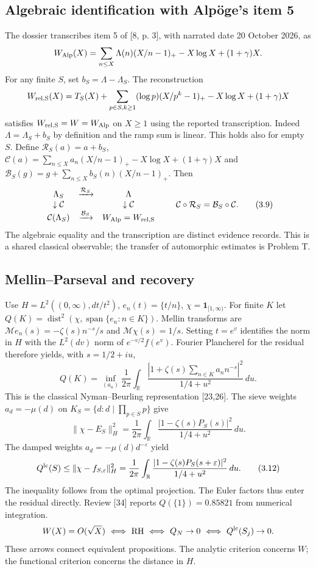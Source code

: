\documentclass[11pt,a4paper]{article}
\DeclareMathOperator{\dist}{dist}
\newcommand{\RH}{\mathrm{RH}}
\begin{document}
\subsection{Algebraic identification with Alpöge's item 5}
The dossier transcribes item 5 of [8, p. 3], with narrated date 20 October 2026, as
\[W_{\rm Alp}(X)=\sum_{n\le X}\Lambda(n)(X/n-1)_+-X\log X+(1+\gamma)X.\]
For any finite $S$, set $b_S=\Lambda-\Lambda_S$. The reconstruction
\[W_{\rm rel,S}(X)=T_S(X)+\sum_{p\in S,k\ge1}(\log p)(X/p^k-1)_+-X\log X+(1+\gamma)X\]
satisfies $W_{\rm rel,S}=W=W_{\rm Alp}$ on $X\ge1$ using the reported transcription. Indeed $\Lambda=\Lambda_S+b_S$ by definition and the ramp sum is linear. This holds also for empty $S$. Define $\mathcal R_S(a)=a+b_S$, $\mathcal C(a)=\sum_{n\le X}a_n(X/n-1)_+-X\log X+(1+\gamma)X$ and $\mathcal B_S(g)=g+\sum_{n\le X}b_S(n)(X/n-1)_+$. Then
\[\begin{array}{ccc}\Lambda_S&\xrightarrow{\mathcal R_S}&\Lambda\\\downarrow\mathcal C&&\downarrow\mathcal C\\\mathcal C(\Lambda_S)&\xrightarrow{\mathcal B_S}&W_{\rm Alp}=W_{\rm rel,S}\end{array}\qquad \mathcal C\circ\mathcal R_S=\mathcal B_S\circ\mathcal C.\tag{3.9}\]
The algebraic equality and the transcription are distinct evidence records. This is a shared classical observable; the transfer of automorphic estimates is Problem T.
\subsection{Mellin--Parseval and recovery}
Use $H=L^2((0,\infty),dt/t^2)$, $e_n(t)=\{t/n\}$, $\chi=\mathbf1_{[1,\infty)}$. For finite $K$ let $Q(K)=\dist^2(\chi,\operatorname{span}\{e_n:n\in K\})$. Mellin transforms are $\mathcal M e_n(s)=-\zeta(s)n^{-s}/s$ and $\mathcal M\chi(s)=1/s$. Setting $t=e^v$ identifies the norm in $H$ with the $L^2(dv)$ norm of $e^{-v/2}f(e^v)$. Fourier Plancherel for the residual therefore yields, with $s=1/2+iu$,
\[Q(K)=\inf_{(a_n)}\frac1{2\pi}\int_{\mathbb R}\frac{|1+\zeta(s)\sum_{n\in K}a_nn^{-s}|^2}{1/4+u^2}\,du.\tag{3.10}\]
This is the classical Nyman--Beurling representation [23,26]. The sieve weights $a_d=-\mu(d)$ on $K_S=\{d:d\mid\prod_{p\in S}p\}$ give
\[\|\chi-E_S\|_H^2=\frac1{2\pi}\int_{\mathbb R}\frac{|1-\zeta(s)P_S(s)|^2}{1/4+u^2}\,du.\tag{3.11}\]
The damped weights $a_d=-\mu(d)d^{-\varepsilon}$ yield
\[Q^{\rm lc}(S)\le\|\chi-f_{S,\varepsilon}\|_H^2=\frac1{2\pi}\int_{\mathbb R}\frac{|1-\zeta(s)P_S(s+\varepsilon)|^2}{1/4+u^2}\,du.\tag{3.12}\]
The inequality follows from the optimal projection. The Euler factors thus enter the residual directly. Review [34] reports $Q(\{1\})=0.85821$ from numerical integration.
\[W(X)=O(\sqrt X)\ \Longleftrightarrow\ \RH\ \Longleftrightarrow\ Q_N\to0\ \Longleftrightarrow\ Q^{\rm lc}(S_j)\to0.\]
These arrows connect equivalent propositions. The analytic criterion concerns $W$; the functional criterion concerns the distance in $H$.
\end{document}
